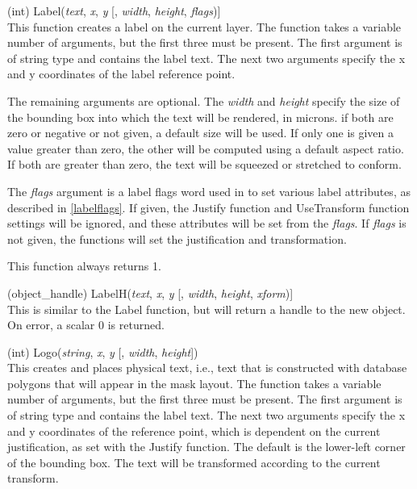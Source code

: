 \begin{description}
\item{(int) \vt Label({\it text}, {\it x}, {\it y} [, {\it width\/},
{\it height\/}, {\it flags\/})]}\\
This function creates a label on the current layer.  The function
takes a variable number of arguments, but the first three must be
present.  The first argument is of string type and contains the label
text.  The next two arguments specify the x and y coordinates of the
label reference point.

The remaining arguments are optional.  The {\it width} and {\it
height} specify the size of the bounding box into which the text will
be rendered, in microns.  if both are zero or negative or not given, a
default size will be used.  If only one is given a value greater than
zero, the other will be computed using a default aspect ratio.  If
both are greater than zero, the text will be squeezed or stretched to
conform.

The {\it flags} argument is a label flags word used in {\Xic} to set
various label attributes, as described in \ref{labelflags}.  If given,
the {\vt Justify} function and {\vt UseTransform} function settings
will be ignored, and these attributes will be set from the {\it
flags}.  If {\it flags} is not given, the functions will set the
justification and transformation.

This function always returns 1.

\item{(object\_handle) \vt LabelH({\it text}, {\it x}, {\it y}
 [, {\it width\/}, {\it height\/}, {\it xform\/})]}\\
This is similar to the {\vt Label} function, but will return a handle
to the new object.  On error, a scalar 0 is returned.

\item{(int) \vt Logo({\it string\/}, {\it x\/}, {\it y\/} [, {\it width\/},
{\it height\/}])}\\
This creates and places physical text, i.e., text that is constructed
with database polygons that will appear in the mask layout.  The
function takes a variable number of arguments, but the first three
must be present.  The first argument is of string type and contains
the label text.  The next two arguments specify the x and y
coordinates of the reference point, which is dependent on the current
justification, as set with the {\vt Justify} function.  The default is
the lower-left corner of the bounding box.  The text will be
transformed according to the current transform.


\end{description}
